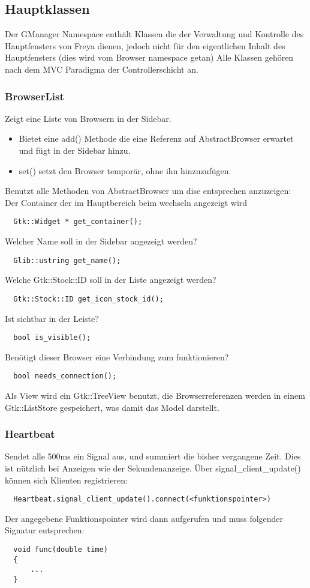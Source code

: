 \subsection{Hauptklassen}
Der GManager Namespace enthält Klassen die der Verwaltung und Kontrolle des Hauptfensters von Freya dienen,
jedoch nicht für den eigentlichen Inhalt des Hauptfensters (dies wird vom Browser namespace getan)
Alle Klassen gehören nach dem MVC Paradigma der Controllerschicht an.

\subsubsection{BrowserList}
Zeigt eine Liste von Browsern in der Sidebar.
\begin{itemize} 
\item Bietet eine add() Methode die eine Referenz auf AbstractBrowser erwartet und fügt in der Sidebar hinzu.
\item set() setzt den Browser temporär, ohne ihn hinzuzufügen.
\end{itemize}
Benutzt alle Methoden von AbstractBrowser um dise entsprechen anzuzeigen:
\\
Der Container der im Hauptbereich beim wechseln angezeigt wird
\begin{verbatim}
  Gtk::Widget * get_container();
\end{verbatim}
Welcher Name soll in der Sidebar angezeigt werden?
\begin{verbatim}
  Glib::ustring get_name();
\end{verbatim}
Welche Gtk::Stock::ID soll in der Liste angezeigt werden?
\begin{verbatim}
  Gtk::Stock::ID get_icon_stock_id();
\end{verbatim} 
Ist sichtbar in der Leiste?
\begin{verbatim}
  bool is_visible(); 
\end{verbatim}
Benötigt dieser Browser eine Verbindung zum funktionieren?
\begin{verbatim}
  bool needs_connection(); 
\end{verbatim}

Als View wird ein Gtk::TreeView benutzt, die Browserreferenzen werden in einem Gtk::ListStore gespeichert,
was damit das Model darstellt. 

\subsubsection{Heartbeat}
Sendet alle 500ms ein Signal aus, und summiert die bisher vergangene Zeit.
Dies ist nützlich bei Anzeigen wie der Sekundenanzeige.
Über signal\_client\_update() können sich Klienten registrieren:
\begin{verbatim}
  Heartbeat.signal_client_update().connect(<funktionspointer>)
\end{verbatim}
Der angegebene Funktionspointer wird dann aufgerufen und muss folgender Signatur entsprechen:
\begin{verbatim}
  void func(double time)
  {
      ...
  }
\end{verbatim}

